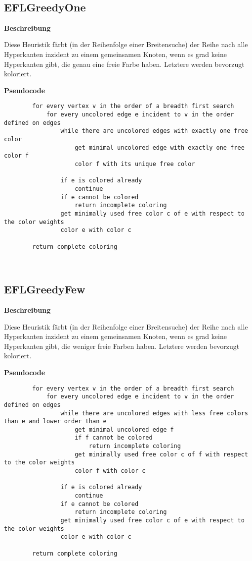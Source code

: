 \documentclass{article}
\begin{document}
	~\newline
	~\newline
	
	\subsection{EFLGreedyOne}
	
	\textbf{Beschreibung}
	
	Diese Heuristik färbt (in der Reihenfolge einer Breitensuche) der Reihe nach alle Hyperkanten inzident zu einem gemeinsamen Knoten, wenn es grad keine Hyperkanten gibt, die genau eine freie Farbe haben. Letztere werden bevorzugt koloriert.
	
	\textbf{Pseudocode}
	\begin{verbatim}    
		for every vertex v in the order of a breadth first search
		    for every uncolored edge e incident to v in the order defined on edges
		        while there are uncolored edges with exactly one free color
		            get minimal uncolored edge with exactly one free color f
		            color f with its unique free color
		            
		        if e is colored already
		            continue
		        if e cannot be colored
		            return incomplete coloring
		        get minimally used free color c of e with respect to the color weights
		        color e with color c
				        
		return complete coloring
	\end{verbatim}
	
	~\newpage
	\subsection{EFLGreedyFew}
	
	\textbf{Beschreibung}
	
	Diese Heuristik färbt (in der Reihenfolge einer Breitensuche) der Reihe nach alle Hyperkanten inzident zu einem gemeinsamen Knoten, wenn es grad keine Hyperkanten gibt, die weniger freie Farben haben. Letztere werden bevorzugt koloriert.
	
	\textbf{Pseudocode}
	\begin{verbatim}  
		for every vertex v in the order of a breadth first search
		    for every uncolored edge e incident to v in the order defined on edges
		        while there are uncolored edges with less free colors than e and lower order than e
		            get minimal uncolored edge f
		            if f cannot be colored
		                return incomplete coloring
		            get minimally used free color c of f with respect to the color weights
		            color f with color c
		            
		        if e is colored already
		            continue
		        if e cannot be colored
		            return incomplete coloring
		        get minimally used free color c of e with respect to the color weights
		        color e with color c
				        
		return complete coloring
	\end{verbatim}
	
\end{document}

